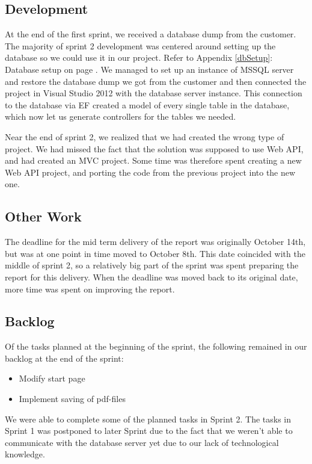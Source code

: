 \subsection{Development}
At the end of the first sprint, we received a database dump from the customer. The majority of sprint 2 development was centered around setting up the database so we could use it in our project. Refer to Appendix \ref{dbSetup}: Database setup on page \pageref{dbSetup}.
We managed to set up an instance of MSSQL server and restore the database dump we got from the customer and then connected the project in Visual Studio 2012 with the database server instance. This connection to the database via EF created a model of every single table in the database, which now let us generate controllers for the tables we needed.

Near the end of sprint 2, we realized that we had created the wrong type of project. We had missed the fact that the solution was supposed to use Web API, and had created an MVC project. Some time was therefore spent creating a new Web API project, and porting the code from the previous project into the new one.

\subsection{Other Work}
The deadline for the mid term delivery of the report was originally October 14th, but was at one point in time moved to October 8th. This date coincided with the middle of sprint 2, so a relatively big part of the sprint was spent preparing the report for this delivery. When the deadline was moved back to its original date, more time was spent on improving the report.

\subsection{Backlog}
Of the tasks planned at the beginning of the sprint, the following remained in our backlog at the end of the sprint:
\begin{itemize}
	\item Modify start page
	\item Implement saving of pdf-files
\end{itemize}
We were able to complete some of the planned tasks in Sprint 2. The tasks in Sprint 1 was postponed to later Sprint due to the fact that we weren't able to communicate with the database server yet due to our lack of technological knowledge.

